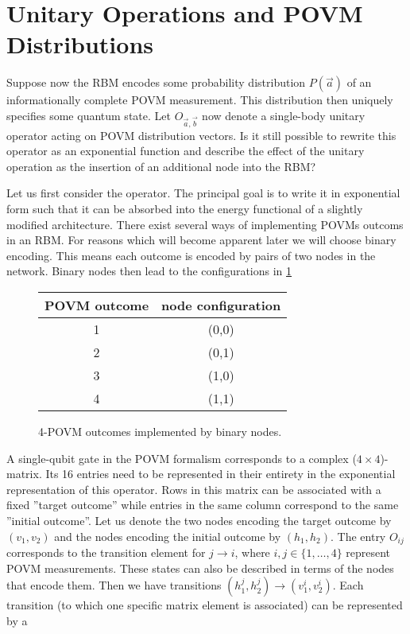 \documentclass{article}
\begin{document}
\section{Unitary Operations and POVM Distributions}
Suppose now the RBM encodes some probability distribution $P(\vec{a})$ of an
informationally complete POVM measurement. This distribution then uniquely
specifies some quantum state. Let $O_{\vec{a},\vec{b}}$ now denote a single-body
unitary operator acting on POVM distribution vectors. Is it still possible to
rewrite this operator as an exponential function and describe the effect of the
unitary operation as the insertion of an additional node into the RBM? \par
Let us first consider the operator. The principal goal is to write it in
exponential form such that it can be absorbed into the energy functional of a
slightly modified architecture. There exist several ways of implementing POVMs
outcoms in an RBM. For reasons which will become apparent later we will choose
binary encoding. This means each outcome is encoded by pairs of two nodes in the
network. Binary nodes then lead to the configurations in \ref{tab:node_conf}
%
\begin{figure}[h!]
  \centering
  \begin{tabular}{c|c}
      POVM outcome & node configuration \\
      \hline
      1 & (0,0) \\
      2 & (0,1) \\
      3 & (1,0) \\
      4 & (1,1)
  \end{tabular}
  \caption{4-POVM outcomes implemented by binary nodes.}
  \label{tab:node_conf}
\end{figure}
%
A single-qubit gate in the POVM formalism corresponds to a complex
($4\times4$)-matrix. Its 16 entries need to be represented in their entirety in
the exponential representation of this operator. Rows in this matrix can be
associated with a fixed ''target outcome'' while entries in the same column
correspond to the same ''initial outcome''. Let us denote the two nodes encoding
the target outcome by $(v_1, v_2)$ and the nodes encoding the initial outcome
by $(h_1, h_2)$. The entry $O_{ij}$ corresponds to the transition element for
$j\rightarrow i$, where $i,j\in\{1,\hdots,4\}$ represent POVM measurements.
These states can also be described in terms of the nodes that encode them. Then
we have transitions $(h^j_1,h^j_2)\rightarrow(v^i_1,v^i_2)$. Each transition
(to which one specific matrix element is associated) can be represented by a
\end{document}
